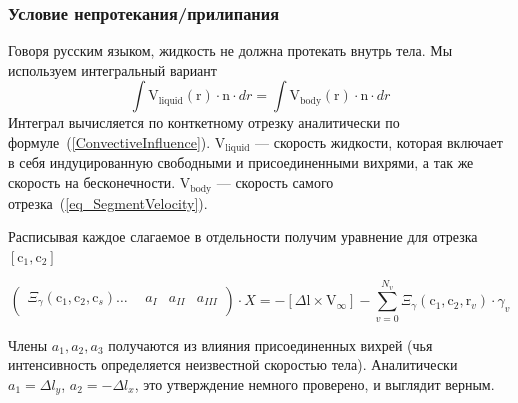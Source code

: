 \documentclass[14pt]{extreport}
\newcommand{\br}[1]{\boldsymbol{\mathrm{#1}}}
\renewcommand{\vec}[1]{\br{#1}}
\begin{document}
\subsubsection{Условие непротекания/прилипания}
\label{slau_noslip}

Говоря русским языком, жидкость не должна протекать внутрь тела. Мы используем интегральный вариант
\begin{equation*}
\int{\vec V_\text{liquid}(\vec r) \cdot \vec n \cdot dr} = \int {\vec V_\text{body}(\vec r) \cdot \vec n \cdot dr}
\end{equation*}
Интеграл вычисляется по конткетному отрезку аналитически по формуле~(\ref{ConvectiveInfluence}). $\br V_\text{liquid}$ --- скорость жидкости, которая включает в себя индуцированную свободными и присоединенными вихрями, а так же скорость на бесконечности. $\br V_\text{body}$ --- скорость самого отрезка~(\ref{eq_SegmentVelocity}).

Расписывая каждое слагаемое в отдельности получим уравнение для отрезка $[\vec c_1, \vec c_2]$

\begin{equation}
\label{eq_noslip}
\left(\begin{matrix}
\Xi_\gamma(\vec c_1, \vec c_2, \vec c_s)\dotsc& ~~a_{I}& a_{II}& a_{III}\\
\end{matrix}\right)
\cdot X
=
-[\Delta \vec l \times \vec V_\infty] - \sum\limits_{v=0}^{N_v} \Xi_\gamma (\vec c_1, \vec c_2, \vec r_v) \cdot \gamma_v
\end{equation}

Члены $a_1, a_2, a_3$ получаются из влияния присоединенных вихрей (чья интенсивность определяется неизвестной скоростью тела). Аналитически $a_1 = \Delta l_y$, $a_2 = -\Delta l_x$, это утверждение немного проверено, и выглядит верным.
\end{document}
